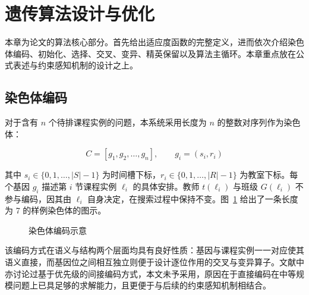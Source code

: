 \hspace*{\fill}

\section{遗传算法设计与优化}

本章为论文的算法核心部分。首先给出适应度函数的完整定义，进而依次介绍染色体编码、初始化、选择、交叉、变异、精英保留以及算法主循环。本章重点放在公式表述与约束感知机制的设计之上。

\subsection{染色体编码}

对于含有 $n$ 个待排课程实例的问题，本系统采用长度为 $n$ 的整数对序列作为染色体：

\begin{equation}
  C = [g_1, g_2, \ldots, g_n], \qquad g_i = (s_i, r_i)
\end{equation}

其中 $s_i \in \{0, 1, \ldots, |S|-1\}$ 为时间槽下标，$r_i \in \{0, 1, \ldots, |R|-1\}$ 为教室下标。每个基因 $g_i$ 描述第 $i$ 节课程实例 $\ell_i$ 的具体安排。教师 $t(\ell_i)$ 与班级 $G(\ell_i)$ 不参与编码，因其由 $\ell_i$ 自身决定，在搜索过程中保持不变。图~\ref{fig:encoding} 给出了一条长度为 7 的样例染色体的图示。

\begin{figure}[H]
  \centering
  \caption{染色体编码示意}
  \label{fig:encoding}
\end{figure}

该编码方式在语义与结构两个层面均具有良好性质：基因与课程实例一一对应使其语义直接，而基因位之间相互独立则便于设计逐位作用的交叉与变异算子。文献中亦讨论过基于优先级的间接编码方式，本文未予采用，原因在于直接编码在中等规模问题上已具足够的求解能力，且更便于与后续的约束感知机制相结合。

